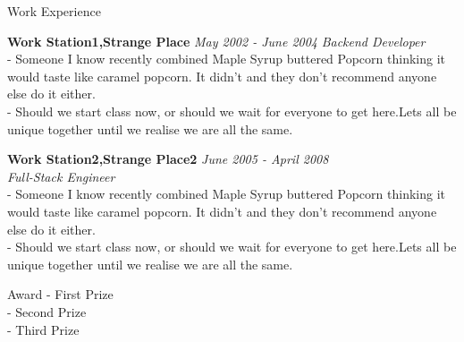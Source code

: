 \documentclass{cv-2020-soft-dev} %
\begin{document}
\begin{rSection}{Work Experience}

{\bf Work Station1,Strange Place } \hfill {\em May 2002 - June 2004} 
{\textit{Backend Developer}}\\
- Someone I know recently combined Maple Syrup  buttered Popcorn thinking it would taste like caramel popcorn. It didn’t and they don’t recommend anyone else do it either.
\\- Should we start class now, or should we wait for everyone to get here.Lets all be unique together until we realise we are all the same.

{\bf Work Station2,Strange Place2} \hfill {\em June 2005 - April 2008} 
\\{\textit{Full-Stack Engineer}}
\\- Someone I know recently combined Maple Syrup buttered Popcorn thinking it would taste like caramel popcorn. It didn’t and they don’t recommend anyone else do it either.
\\- Should we start class now, or should we wait for everyone to get here.Lets all be unique together until we realise we are all the same.




\end{rSection}
\begin{rSection}{Award}
- First Prize\\
- Second Prize\\
- Third Prize\\
\end{rSection}


\end{document}

